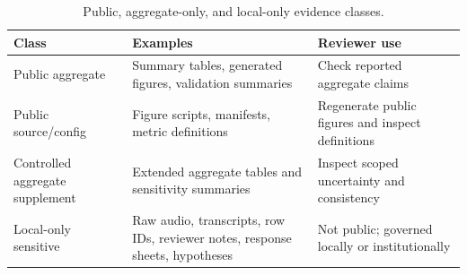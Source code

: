 \begin{table}[htbp]
\centering
\caption{Public, aggregate-only, and local-only evidence classes.}
\label{tab:evidence_classes}
\begin{tabularx}{\linewidth}{@{}lLL@{}}
\toprule
Class & Examples & Reviewer use \\
\midrule
Public aggregate & Summary tables, generated figures, validation summaries & Check reported aggregate claims \\
Public source/config & Figure scripts, manifests, metric definitions & Regenerate public figures and inspect definitions \\
Controlled aggregate supplement & Extended aggregate tables and sensitivity summaries & Inspect scoped uncertainty and consistency \\
Local-only sensitive & Raw audio, transcripts, row IDs, reviewer notes, response sheets, hypotheses & Not public; governed locally or institutionally \\
\bottomrule
\end{tabularx}
\end{table}
